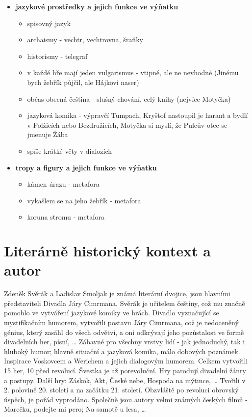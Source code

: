 \documentclass[11pt]{article}
\begin{document}
\begin{itemize}
\begin{itemize}
        \end{itemize}
        \item\textbf{jazykové prostředky a jejich funkce ve výňatku}
        \begin{itemize}
            \item spisovný jazyk
            \item archaismy - vechtr, vechtrovna, šraňky
            \item historismy - telegraf
            \item v každé hře mají jeden vulgarismus - vtipné, ale ne nevhodné (Jinému bych žebřík půjčil, ale Hájkovi naser)
            \item občas obecná čeština - slušný chování, celý knihy (nejvíce Motyčka)
            \item jazyková komika - výpravčí Tumpach, Kryštof nastoupil je harant a bydlí v Polžicích nebo Bezdružicích, Motyčka si myslí, že Pulcův otec se jmenuje Žába
            \item spíše krátké věty v dialozích
        \end{itemize}
        \item\textbf{tropy a figury a jejich funkce ve výňatku}
        \begin{itemize}
            \item kámen úrazu - metafora
            \item vykašlem se na jeho žebřík - metafora
            \item koruna stromu - metafora
        \end{itemize}
    \end{itemize}
    \section*{Literárně historický kontext a autor}
    Zdeněk Svěrák a Ladislav Smoljak je známá literární dvojice, jsou hlavními představiteli Divadla Járy Cimrmana.
    Svěrák je učitelem češtiny, což mu značně pomohlo ve vytváření jazykové komiky ve hrách.
    Divadlo vyznačující se mystifikačním humorem, vytvořili postavu Járy Cimrmana, což je nedoceněný génius, který zasáhl do všech odvětví, a oni odkrývají jeho pozůstalost ve formě divadelních her, písní, \dots
    Zábavné pro všechny vrstvy lidí - jak jednoduchý, tak i hluboký humor; hlavně situační a jazyková komika, málo dobových poznámek.
    Inspirace Voskovcem a Werichem a jejich dialogovým humorem.
    Celkem vytvořili 15 her, 10 před revolucí. Švestka je až porevoluční. Hry parodují divadelní žánry a postupy.
    Další hry: Záskok, Akt, České nebe, Hospoda na mýtince, \dots
    Tvořili v 2. polovině 20. století a na začátku 21. století.
    Obzvláště po revoluci obrovský úspěch, je pořád vyprodáno.
    Společně jsou autory velmi známých českých filmů - Marečku, podejte mi pero; Na samotě u lesa, \dots
\end{document}
